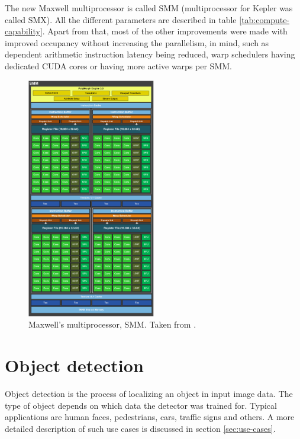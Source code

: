 The new Maxwell multiprocessor is called SMM (multiprocessor for Kepler was called SMX). All the different parameters are described in table \ref{tab:compute-capability}. Apart from that, most of the other improvements were made with improved occupancy without increasing the parallelism, in mind, such as dependent arithmetic instruction latency being reduced, warp schedulers having dedicated CUDA cores or having more active warps per SMM.

\begin{center}
\begin{figure}[ht]
	\centering\includegraphics[width=0.50\textwidth]{fig/smm.png}
	\caption{Maxwell's multiprocessor, SMM.	Taken from \cite{maxwell-whitepaper}.}\label{fig:smm}
\end{figure}
\end{center}

\chapter{Object detection} \label{ch:object-detection}

Object detection is the process of localizing an object in input image data. The type of object depends on which data the detector was trained for. Typical applications are human faces, pedestrians, cars, traffic signs and others. A more detailed description of such use cases is discussed in section \ref{sec:use-cases}.

